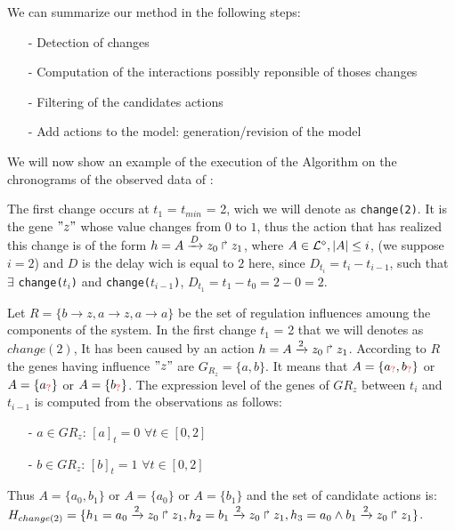 We can summarize our method in the following steps:
\begin{itemize}
\item[-] Detection of changes
\item[-] Computation of the interactions possibly reponsible of thoses changes
\item[-] Filtering of the candidates actions
\item[-] Add actions to the model: generation/revision of the model
\end{itemize}


We will now show an example of the execution of the Algorithm  on the chronograms of the observed data of :


The first change occurs at $t_1$ = $t_{min}$ = 2,
wich we will denote as \texttt{change(2)}. It is the gene $"z"$ whose value changes from $0$ to $1$, thus the action that has realized this change is of the form $h = A\xrightarrow{D} z_0 \Rsh z_1$,
where $ A \in \mathcal{L}^{\diamond}, | A| \leq i$, (we suppose $i=2$) and $D$ is the delay wich is equal to $2$ here, since
$D_{t_i}=t_i - t_{i-1}$, such that $\exists$ \texttt{change($t_i$)} and \texttt{change($t_{i-1}$)},
$D_{t_1}= t_1 - t_0 = 2 - 0 = 2$.

Let $R=\{ b \rightarrow z, a \rightarrow z, a \rightarrow a \}$
be the set of regulation influences amoung the components of the system.
%
In the first change $t_1$ = 2 that we will denotes as $change(2)$,
It has been caused by an action $h = A\xrightarrow{2} z_0 \Rsh z_1$. According to $R$ the genes having influence $"z"$ are $G_{R_z} = \{a, b\}$. It means that $A= \{ a_{\textcolor{red}{?}}, b_{\textcolor{red}{?}} \} $ or $A= \{ a_{\textcolor{red}{?}} \} $ or $A= \{ b_{\textcolor{red}{?}} \} $.
%
The expression level of the genes of $G{R_z}$ between $t_i$ and $t_{i-1}$ is computed from the observations as follows:
\begin{itemize}
\item[-] $a \in  G{R_z}$: $[a]_t=0$ $\forall t \in [0,2] $
\item[-] $b \in  G{R_z}$: $[b]_t=1$ $\forall t \in [0,2] $
\end{itemize}
%
Thus $A= \{ a_0, b_1 \} $ or $A= \{ a_0\} $ or $A= \{ b_1 \} $ and the set of candidate actions is:
$H_{change(2)} = \{ h_1=a_0\xrightarrow{2} z_0 \Rsh z_1
, h_2=b_1\xrightarrow{2} z_0 \Rsh z_1
, h_3=a_0 \wedge b_1 \xrightarrow{2} z_0 \Rsh z_1 \}$.

